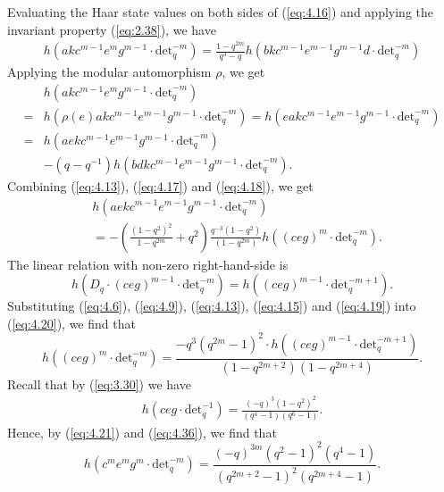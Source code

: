 \documentclass[table,a4paper,reqno]{amsart}
\numberwithin{equation}{section}
\theoremstyle{definition}
\begin{document}
Evaluating the Haar state values on both sides of (\ref{eq:4.16}) and applying the invariant property (\ref{eq:2.38}), we have
\begin{equation}\label{eq:4.17}
    \begin{split}
        h(akc^{m-1}e^{m}g^{m-1}\cdot\text{det}_q^{-m})=\frac{1-q^{2m}}{q^{3}-q}h(bkc^{m-1}e^{m-1}g^{m-1}d\cdot\text{det}_q^{-m})
    \end{split}
\end{equation}
Applying the modular automorphism $\rho$, we get
\begin{equation}\label{eq:4.18}
\begin{split}
    &h(akc^{m-1}e^{m}g^{m-1}\cdot\text{det}_q^{-m})\\
    =&h(\rho(e)akc^{m-1}e^{m-1}g^{m-1}\cdot\text{det}_q^{-m})=h(eakc^{m-1}e^{m-1}g^{m-1}\cdot\text{det}_q^{-m})\\
    =&h(aekc^{m-1}e^{m-1}g^{m-1}\cdot\text{det}_q^{-m})\\
    &-(q-q^{-1})h(bdkc^{m-1}e^{m-1}g^{m-1}\cdot\text{det}_q^{-m}).
\end{split}
\end{equation}
Combining (\ref{eq:4.13}), (\ref{eq:4.17}) and (\ref{eq:4.18}), we get
\begin{equation}\label{eq:4.19}
\begin{split}
    &h(aekc^{m-1}e^{m-1}g^{m-1}\cdot\text{det}_q^{-m})\\
    &=-\left(\frac{(1-q^2)^2}{1-q^{2m}}+q^2\right)\frac{q^{-3}(1-q^2)}{(1-q^{2m})}h((ceg)^m\cdot\text{det}_q^{-m}).
\end{split}
\end{equation}
The linear relation with non-zero right-hand-side is
\begin{equation}\label{eq:4.20}
    h(D_q\cdot(ceg)^{m-1}\cdot\text{det}_q^{-m})=h((ceg)^{m-1}\cdot\text{det}_q^{-m+1}).
\end{equation}
Substituting (\ref{eq:4.6}), (\ref{eq:4.9}), (\ref{eq:4.13}), (\ref{eq:4.15}) and (\ref{eq:4.19}) into (\ref{eq:4.20}), we find that
\begin{equation}\label{eq:4.21}
    h\left((ceg)^{m}\cdot\text{det}_q^{-m}\right)=\frac{-q^3(q^{2m}-1)^2\cdot h\left((ceg)^{m-1}\cdot\text{det}_q^{-m+1}\right)}{(1-q^{2m+2})(1-q^{2m+4})}.
\end{equation}
Recall that by (\ref{eq:3.30}) we have
\begin{align}\label{eq:4.36}
    h(ceg\cdot\text{det}_q^{-1})=\frac{(-q)^3(1-q^2)^2}{(q^4-1)(q^6-1)}.
\end{align}
Hence, by (\ref{eq:4.21}) and (\ref{eq:4.36}), we find that
\begin{equation}\label{eq:4.37}
    h\left(c^me^mg^m\cdot\text{det}_q^{-m}\right)=\frac{(-q)^{3m}(q^2-1)^2(q^4-1)}{(q^{2m+2}-1)^2(q^{2m+4}-1)}.
\end{equation}
\end{document}
